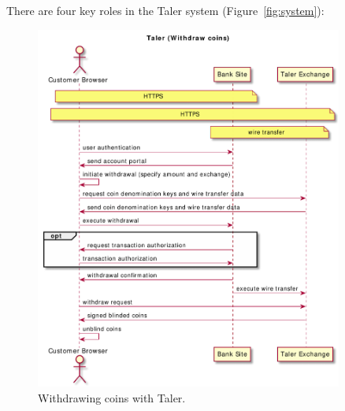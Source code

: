 \documentclass{llncs}
\begin{document}
There are four key roles in the Taler system (Figure~\ref{fig:system}):

\begin{figure}[b!]
\includegraphics[width=0.9\textwidth]{figs/taler-withdraw.pdf}
\caption{Withdrawing coins with Taler.}
\label{fig:taler-withdraw}
\end{figure}
\end{document}
